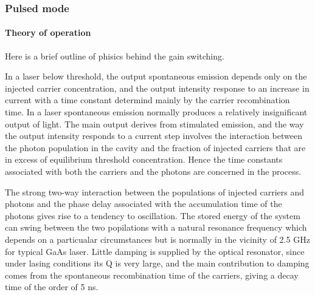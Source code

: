 \subsubsection{Pulsed mode}

\paragraph{Theory of operation}

Here is a brief outline of phisics behind the gain switching.

In a laser below threshold, the output
spontaneous emission depends only on the injected carrier
concentration, and the output intensity response to an increase in
current with a time constant determind mainly by the carrier
recombination time. In a laser spontaneous emission normally produces
a relatively insignificant output of light. The main output derives
from stimulated emission, and the way the output intensity responds to
a current step involves the interaction between the photon population
in the cavity and the fraction of injected carriers that are in excess
of equilibrium threshold concentration. Hence the time constants
associated with both the carriers and the photons are concerned in the
process.

The strong two-way interaction between the populations of injected
carriers and photons and the phase delay associated with the
accumulation time of the photons gives rise to a tendency to
oscillation. The stored energy of the system can swing between the two
popilations with a natural resonance frequency which depends on a
particualar circumstances but is normally in the vicinity of 2.5 GHz
for typical GaAs laser. Little damping is supplied by the optical
resonator, since under lasing conditions its Q is very large, and the
main contribution to damping comes from the spontaneous recombination
time of the carriers, giving a decay time of the order of 5 ns.

